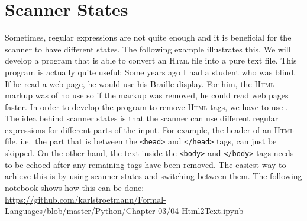 \section{Scanner States}
Sometimes, regular expressions are not quite enough and it is beneficial for the scanner to have different
states.  The following example illustrates this.  We will develop a program that is able to convert an 
\textsc{Html} file into a pure text file.  This program is actually quite useful: Some years ago I
had a student who was blind.  If he read a web page, he would use his Braille display.  For him,
the \textsc{Html} markup was of no use so if the markup was removed, he could read web pages faster.
In order to develop the program to remove \textsc{Html} tags, we have to use .
  The idea behind scanner states is that the scanner can use different regular
expressions for different parts of the input.  For example, the header of an \textsc{Html} file, i.e.~the part
that is between the \texttt{<head>} and \texttt{</head>} tags, can just be
skipped.  On the other hand, the text inside the \texttt{<body>} and \texttt{</body>} tags needs to be echoed
after any remaining tags have been removed.  The easiest way to achieve this is by using scanner states and
switching between them.  The following notebook shows how this can be done:
\\[0.2cm]
\hspace*{-1.3cm}
\href{https://github.com/karlstroetmann/Formal-Languages/blob/master/Python/Chapter-03/04-Html2Text.ipynb}{https://github.com/karlstroetmann/Formal-Languages/blob/master/Python/Chapter-03/04-Html2Text.ipynb}
\\

